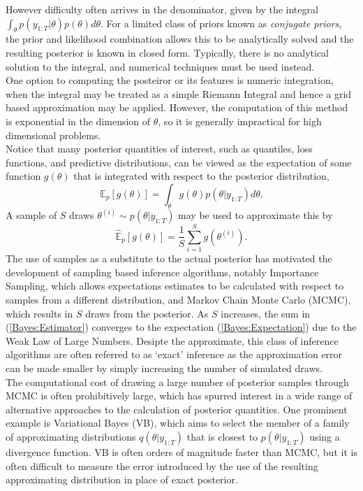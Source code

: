 \documentclass[
12pt, %
onehalfspacing, %
nohyperref, %
headsepline, %
chapterinoneline, %
]{MastersDoctoralThesis} %
\begin{document}
However difficulty often arrives in the denominator, given by the integral $\int_{\theta} p(y_{1:T} | \theta)p(\theta) d\theta$. For a limited class of priors known as \textit{conjugate priors}, the prior and likelihood combination allows this to be analytically solved and the resulting posterior is known in closed form. Typically, there is no analytical solution to the integral, and numerical techniques must be used instead.
\\

One option to computing the posteiror or its features is numeric integration, when the integral may be treated as a simple Riemann Integral and hence a grid based approximation may be applied. However, the computation of this method is exponential in the dimension of $\theta$, so it is generally impractical for high dimensional problems. 
\\

Notice that many posterior quantities of interest, such as quantiles, loss functions, and predictive distributions, can be viewed as the expectation of some function $g(\theta)$ that is integrated with respect to the posterior distribution,
\begin{equation}
\label{Bayes:Expectation}
\mathbb{E}_{p} [g(\theta)] = \int_{\theta} g(\theta) p(\theta | y_{1:T}) d\theta. 
\end{equation}
A sample of $S$ draws $\theta^{(i)} \sim p(\theta | y_{1:T})$ may be used to approximate this by
\begin{equation}
\label{Bayes:Estimator}
\hat{\mathbb{E}}_p[g(\theta)] = \frac{1}{S} \sum_{i=1}^S g(\theta^{(i)}).
\end{equation}
The use of samples as a substitute to the actual posterior has motivated the development of sampling based inference algorithms, notably Importance Sampling, which allows expectations estimates to be calculated with respect to samples from a different distribution, and Markov Chain Monte Carlo (MCMC), which results in $S$ draws from the posterior. As $S$ increases, the sum in (\ref{Bayes:Estimator}) converges to the expectation (\ref{Bayes:Expectation}) due to the Weak Law of Large Numbers. Desipte the approximate, this class of inference algorithms are often referred to as `exact' inference as the approximation error can be made smaller by simply increasing the number of simulated draws.
\\

The computational cost of drawing a large number of posterior samples through MCMC is often prohibitively large, which has spurred interest in a wide range of alternative approaches to the calculation of posterior quantities. One prominent example is Variational Bayes (VB), which aims to select the member of a family of approximating distributions $q(\theta | y_{1:T})$ that is closest to $p(\theta | y_{1:T})$ using a divergence function. VB is often orders of magnitude faster than MCMC, but it is often difficult to measure the error introduced by the use of the resulting approximating distribution in place of exact posterior.
\\
\end{document}
